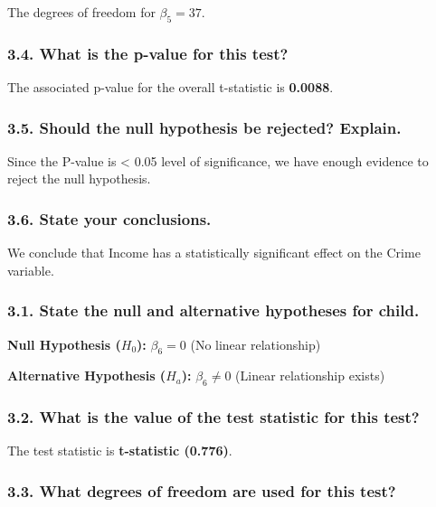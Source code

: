 \documentclass[
]{article}
\begin{document}
The degrees of freedom for \(\beta_5 = 37\).

\subsubsection{3.4. What is the p-value for this
test?}\label{what-is-the-p-value-for-this-test-5}

The associated p-value for the overall t-statistic is \textbf{0.0088}.

\subsubsection{3.5. Should the null hypothesis be rejected?
Explain.}\label{should-the-null-hypothesis-be-rejected-explain.-5}

Since the P-value is \textless{} 0.05 level of significance, we have
enough evidence to reject the null hypothesis.

\subsubsection{3.6. State your
conclusions.}\label{state-your-conclusions.-5}

We conclude that Income has a statistically significant effect on the
Crime variable.

\subsubsection{3.1. State the null and alternative hypotheses for
child.}\label{state-the-null-and-alternative-hypotheses-for-child.-1}

\textbf{Null Hypothesis (\(H_0\)):} \(\beta_6 = 0\) (No linear
relationship)

\textbf{Alternative Hypothesis (\(H_a\)):} \(\beta_6 \neq 0\) (Linear
relationship exists)

\subsubsection{3.2. What is the value of the test statistic for this
test?}\label{what-is-the-value-of-the-test-statistic-for-this-test-6}

The test statistic is \textbf{t-statistic (0.776)}.

\subsubsection{3.3. What degrees of freedom are used for this
test?}\label{what-degrees-of-freedom-are-used-for-this-test-6}
\end{document}
